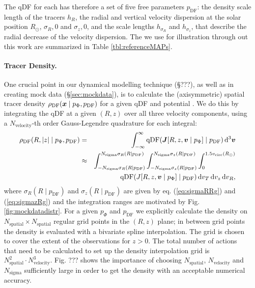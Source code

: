 The qDF for each \MAP has therefore a set of five free parameters $p_\text{DF}$: the density scale length of the tracers $h_R$, the radial and vertical velocity dispersion at the solar position $R_\odot$, $\sigma_R,0$ and $\sigma_z,0$, and the scale lengths $h_{\sigma_R}$ and $h_{\sigma_z}$, that describe the radial decrease of the velocity dispersion. The \MAPs we use for illustration through out this work are summarized in Table \ref{tbl:referenceMAPs}.

\paragraph{Tracer Density.} One crucial point in our dynamical modelling technique (\S ???), as well as in creating mock data (\S\ref{sec:mockdata}), is to calculate the (axisymmetric) spatial tracer density $\rho_\text{DF}(\boldsymbol{x} \mid p_{\Phi},p_\text{DF})$ for a given qDF and potential . We do this by integrating the qDF at a given $(R,z)$ over all three velocity components, using a $N_\text{velocity}$-th order Gauss-Legendre quadrature for each integral:
\begin{eqnarray}
\rho_\text{DF}(R,|z| \mid p_{\Phi},p_\text{DF}) &=& \int_{-\infty}^{\infty} \text{qDF}(\boldsymbol{J}[R,z,\boldsymbol{v} \mid p_{\Phi}] \mid p_\text{DF}) \mathop{}\!\mathrm{d^3}\boldsymbol{v}  \label{eq:tracerdensity_general}\\
&\approx& \int_{-N_\text{sigma} \sigma_R(R \mid p_\text{DF})}^{N_\text{sigma} \sigma_R(R \mid p_\text{DF})} \int_{-N_\text{sigma}\sigma_z(R \mid p_\text{DF})}^{N_\text{sigma} \sigma_z(R \mid p_\text{DF})} \int_{0}^{1.5 v_\text{circ}(R_\odot)}  \nonumber\\
& & \hspace{1cm} \text{qDF}(J[R,z,\boldsymbol{v} \mid p_{\Phi}] \mid p_\text{DF}) \mathop{}\!\mathrm{d} v_T \mathop{}\!\mathrm{d} v_z \mathop{}\!\mathrm{d} v_R, \label{eq:tracerdensity}
\end{eqnarray}
where $\sigma_R(R \mid p_\text{DF})$ and $\sigma_z(R \mid p_\text{DF})$ are given by eq. (\ref{eq:sigmaRRg}) and (\ref{eq:sigmazRg}) and the integration ranges are motivated by Fig. \ref{fig:mockdatadistr}. For a given $p_\Phi$ and $p_\text{DF}$ we explicitly calculate the density on $N_\text{spatial} \times N_\text{spatial}$ regular grid points in the $(R,z)$ plane; in between grid points the density is evaluated with a bivariate spline interpolation. The grid is chosen to cover the extent of the observations for $z>0$. The total number of actions that need to be calculated to set up the density interpolation grid is $N_\text{spatial}^2 \cdot N_\text{velocity}^3$. Fig. ??? shows the importance of choosing $N_\text{spatial}$, $N_\text{velocity}$ and $N_\text{sigma}$ sufficiently large in order to get the density with an acceptable numerical accuracy. 

